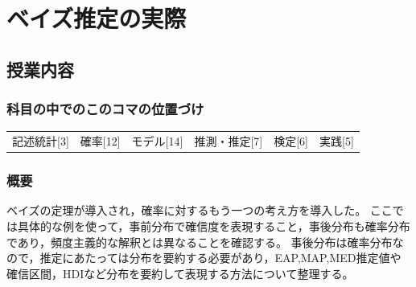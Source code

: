 \section{ベイズ推定の実際}
\label{s26_bayesian2}

\subsection{授業内容}
\subsubsection{科目の中でのこのコマの位置づけ}
\begin{tabular}[t]{cccccc}
	記述統計[3] & 確率[12] & モデル[14] & 推測・推定[7] & 検定[6] & 実践[5]
\end{tabular}

\subsubsection{概要}
ベイズの定理が導入され，確率に対するもう一つの考え方を導入した。
ここでは具体的な例を使って，事前分布で確信度を表現すること，事後分布も確率分布であり，頻度主義的な解釈とは異なることを確認する。
事後分布は確率分布なので，推定にあたっては分布を要約する必要があり，EAP,MAP,MED推定値や確信区間，HDIなど分布を要約して表現する方法について整理する。
